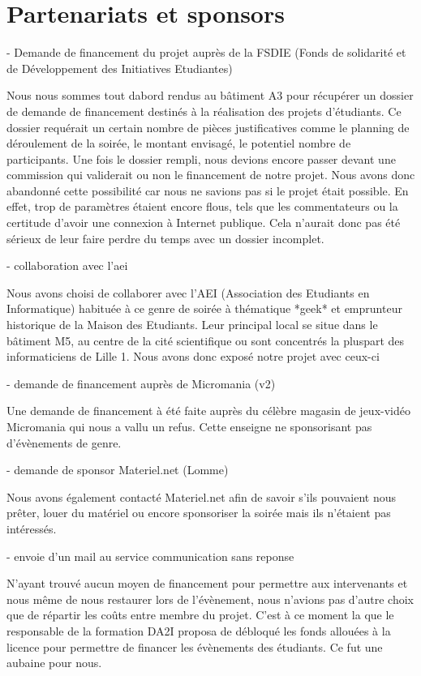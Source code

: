 \section{Partenariats et sponsors}%
\label{sec:partenariats_et_sponsors}

- Demande de financement du projet auprès de la FSDIE (Fonds de solidarité
et de Développement des Initiatives Etudiantes)

Nous nous sommes tout dabord rendus au bâtiment A3 pour récupérer un
dossier de demande de financement destinés à la réalisation des projets d'étudiants. 
Ce dossier requérait un certain nombre de pièces justificatives comme le
planning de déroulement de la soirée, le montant envisagé, le potentiel
nombre de participants. Une fois le dossier rempli, nous devions encore passer devant 
une commission qui validerait ou non le financement de notre projet. Nous avons donc
abandonné cette possibilité car nous ne savions pas si le projet était
possible. En effet, trop de paramètres étaient encore flous, tels que les commentateurs
ou la certitude d'avoir une connexion à Internet publique. Cela n'aurait donc pas été
sérieux de leur faire perdre du temps avec un dossier incomplet.

- collaboration avec l'aei

Nous avons choisi de collaborer avec l'AEI (Association des Etudiants
en Informatique) habituée à ce genre de soirée à thématique *geek* et 
emprunteur historique de la Maison des Etudiants.
Leur principal local se situe dans le bâtiment M5, au centre de la
cité scientifique ou sont concentrés la pluspart des informaticiens de
Lille 1.
Nous avons donc exposé notre projet avec ceux-ci

- demande de financement auprès de Micromania (v2)

Une demande de financement à été faite auprès du célèbre magasin de
jeux-vidéo Micromania qui nous a vallu un refus. Cette
enseigne ne sponsorisant pas d'évènements de genre.

- demande de sponsor Materiel.net (Lomme)

Nous avons également contacté Materiel.net afin de savoir s'ils pouvaient nous prêter,
louer du matériel ou encore sponsoriser la soirée mais ils n'étaient pas intéressés.

- envoie d'un mail au service communication sans reponse

N'ayant trouvé aucun moyen de financement pour permettre aux
intervenants et nous même de nous restaurer lors de l'évènement, nous
n'avions pas d'autre choix que de répartir les coûts entre membre du
projet. C'est à ce moment la que le responsable de la formation DA2I
proposa de débloqué les fonds allouées à la licence pour permettre de
financer les évènements des étudiants. Ce fut une aubaine pour nous.

